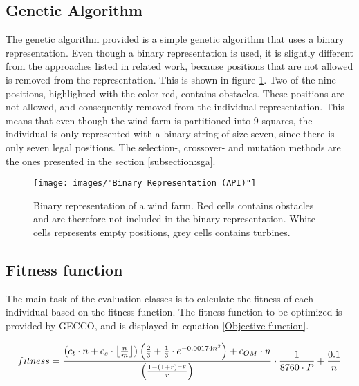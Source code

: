 \subsection{Genetic Algorithm}
The genetic algorithm provided is a simple genetic algorithm that uses a binary representation. Even though a binary representation is used, it is slightly different from the approaches listed in related work, because positions that are not allowed is removed from the representation. This is shown in figure \ref{Binary Representation (API)}. Two of the nine positions, highlighted with the color red, contains obstacles. These positions are not allowed, and consequently removed from the individual representation. This means that even though the wind farm is partitioned into 9 squares, the individual is only represented with a binary string of size seven, since there is only seven legal positions. The selection-, crossover- and mutation methods are the ones presented in the section \ref{subsection:sga}.


\begin{figure}[h!]
\begin{center}
\texttt{[image: images/"Binary Representation (API)"]}
\caption{Binary representation of a wind farm. Red cells contains obstacles and are therefore not included in the binary representation. White cells represents empty positions, grey cells contains turbines.}
\label{Binary Representation (API)}
\end{center}
\end{figure}


\subsection{Fitness function}\label{subsection:fitnessfunction}


The main task of the evaluation classes is to calculate the fitness of each individual based on the fitness function.  The fitness function to be optimized is provided by GECCO, and is displayed in equation \ref{Objective function}.\\

\begin{small}
\begin{equation}
fitness =  \frac{ \left( c_t \cdot n + c_s \cdot \floor*{\frac{n}{m}} \right) \left( \frac{2}{3} + \frac{1}{3} \cdot e^{-0.00174n^2} \right) + c_{OM} \cdot n}{\left( \frac{1 - (1 + r)^{-y}}{r} \right) } \cdot \frac{1}{8760 \cdot P} + \frac{0.1}{n}
\label{Objective function} 
\end{equation}
\end{small}


